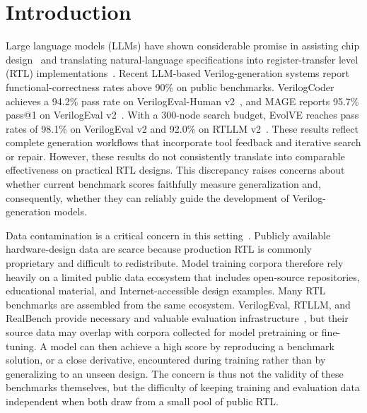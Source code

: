 \section{Introduction} \label{sec:intro}
Large language models (LLMs) have shown considerable promise in assisting chip design~\cite{liu2023chipnemo} and translating natural-language specifications into register-transfer level (RTL) implementations~\cite{zhao2024codev,liu2024rtlcoder,cui2024origen}. Recent LLM-based Verilog-generation systems report functional-correctness rates above 90\% on public benchmarks. VerilogCoder achieves a 94.2\% pass rate on VerilogEval-Human v2~\cite{ho2025verilogcoder}, and MAGE reports 95.7\% pass@1 on VerilogEval v2~\cite{zhao2025mage}. With a 300-node search budget, EvolVE reaches pass rates of 98.1\% on VerilogEval v2 and 92.0\% on RTLLM v2~\cite{hsin2026evolve}. These results reflect complete generation workflows that incorporate tool feedback and iterative search or repair. However, these results do not consistently translate into comparable effectiveness on practical RTL designs. This discrepancy raises concerns about whether current benchmark scores faithfully measure generalization and, consequently, whether they can reliably guide the development of Verilog-generation models.

Data contamination is a critical concern in this setting~\cite{sainz2023nlp,balloccu2024leak}. Publicly available hardware-design data are scarce because production RTL is commonly proprietary and difficult to redistribute. Model training corpora therefore rely heavily on a limited public data ecosystem that includes open-source repositories, educational material, and Internet-accessible design examples. Many RTL benchmarks are assembled from the same ecosystem. VerilogEval, RTLLM, and RealBench provide necessary and valuable evaluation infrastructure~\cite{liu2023verilogeval,lu2024rtllm,jin2025realbench}, but their source data may overlap with corpora collected for model pretraining or fine-tuning. A model can then achieve a high score by reproducing a benchmark solution, or a close derivative, encountered during training rather than by generalizing to an unseen design. The concern is thus not the validity of these benchmarks themselves, but the difficulty of keeping training and evaluation data independent when both draw from a small pool of public RTL.

